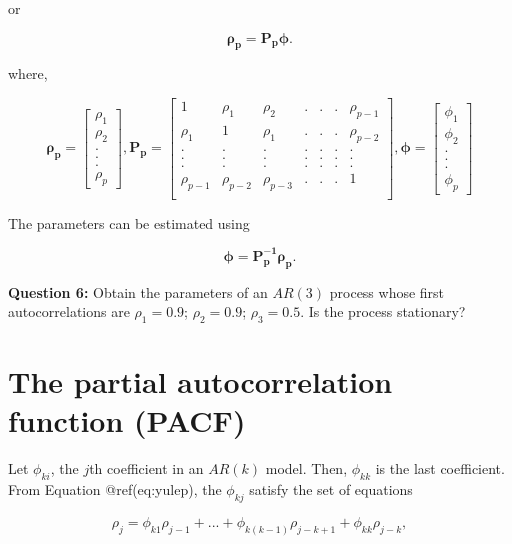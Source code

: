 \documentclass[
  11pt,
  a4paper,
]{report}
\begin{document}
or

\[\bm{\rho_p}=\bm{P_p\phi}.\]

where,

\[\bm{\rho_p} = \left[\begin{array}
{r}
\rho_1  \\
\rho_2  \\
.\\
.\\
.\\
\rho_p
\end{array}\right], \bm{P_p} = \left[\begin{array}
{rrrrrrr}
1 & \rho_1 & \rho_2 & .&.&.& \rho_{p-1} \\
\rho_1 & 1 & \rho_1 & .&.&.& \rho_{p-2} \\
. & . & . & .&.&.& . \\
. & . & . & .&.&.& . \\
. & . & . & .&.&.& . \\
\rho_{p-1} & \rho_{p-2} & \rho_{p-3} & .&.&.& 1 \\
\end{array}\right], \bm{\phi} = \left[\begin{array}
{r}
\phi_1  \\
\phi_2  \\
.\\
.\\
.\\
\phi_p
\end{array}\right]\]

The parameters can be estimated using

\[\bm{\phi}=\bm{P_p^{-1}\rho_p}.\]

\textbf{Question 6:} Obtain the parameters of an \(AR(3)\) process whose
first autocorrelations are \(\rho_1=0.9\); \(\rho_2=0.9\);
\(\rho_3=0.5\). Is the process stationary?

\section{The partial autocorrelation function
(PACF)}\label{the-partial-autocorrelation-function-pacf}

Let \(\phi_{ki}\), the \(j\)th coefficient in an \(AR(k)\) model. Then,
\(\phi_{kk}\) is the last coefficient. From Equation @ref(eq:yulep), the
\(\phi_{kj}\) satisfy the set of equations

\begin{equation}
\rho_j=\phi_{k1}\rho_{j-1}+...+\phi_{k(k-1)}\rho_{j-k+1}+\phi_{kk}\rho_{j-k},
\end{equation}
\end{document}
